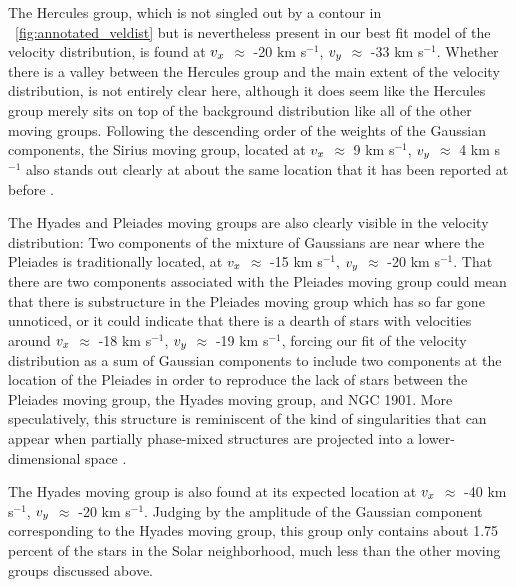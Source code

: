 The Hercules group, which is not singled out by a contour in
\figurename~\ref{fig:annotated_veldist} but is nevertheless present in
our best fit model of the velocity distribution, is found at $v_x$
$\approx$ -20 km s$^{-1}$, $v_y$ $\approx$ -33 km s$^{-1}$. Whether
there is a valley between the Hercules group and the main extent of
the velocity distribution, is not entirely clear here, although it
does seem like the Hercules group merely sits on top of the background
distribution like all of the other moving groups. Following the
descending order of the weights of the Gaussian components, the Sirius
moving group, located at $v_x$ $\approx$ 9 km s$^{-1}$, $v_y$
$\approx$ 4 km s$^{-1}$ also stands out clearly at about the same
location that it has been reported at before
\citep[\eg][]{1998AJ....115.2384D}.

The Hyades and Pleiades moving groups are also clearly visible in the
velocity distribution: Two components of the mixture of Gaussians are
near where the Pleiades is traditionally located, at $v_x$ $\approx$
-15 km s$^{-1}$, $v_y$ $\approx$ -20 km s$^{-1}$. That there are two
components associated with the Pleiades moving group could mean that
there is substructure in the Pleiades moving group which has so far
gone unnoticed, or it could indicate that there is a dearth of stars
with velocities around $v_x$ $\approx$ -18 km s$^{-1}$, $v_y$
$\approx$ -19 km s$^{-1}$, forcing our fit of the velocity
distribution as a sum of Gaussian components to include two components
at the location of the Pleiades in order to reproduce the lack of
stars between the Pleiades moving group, the Hyades moving group, and
NGC 1901. More speculatively, this structure is reminiscent of the
kind of singularities that can appear when partially phase-mixed
structures are projected into a lower-dimensional space
\citep{1999MNRAS.307..877T}.

The Hyades moving group is also found at its expected location at
$v_x$ $\approx$ -40 km s$^{-1}$, $v_y$ $\approx$ -20 km
s$^{-1}$. Judging by the amplitude of the Gaussian component
corresponding to the Hyades moving group, this group only contains
about 1.75\,percent of the stars in the Solar neighborhood, much less
than the other moving groups discussed above.

